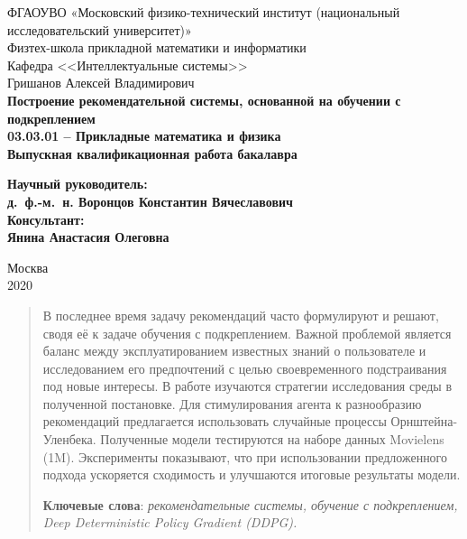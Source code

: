 \documentclass[14pt]{extarticle}
\begin{document}
\thispagestyle{empty}
\begin{center}
    \sc
        ФГАОУВО «Московский физико-технический институт \rm{(национальный исследовательский университет)}»\\
        Физтех-школа прикладной математики и информатики\\
        Кафедра <<Интеллектуальные системы>>\\[35mm]
    \rm\large
        Гришанов Алексей Владимирович\\[10mm]
    \bf\Large
		Построение рекомендательной системы, основанной на обучении с подкреплением\\[10mm]
    \rm\normalsize
        03.03.01 -- Прикладные математика и физика\\[10mm]
    \sc
        Выпускная квалификационная работа бакалавра\\[10mm]
\end{center}
\hfill\parbox{80mm}{
    \begin{flushleft}
    \bf
        Научный руководитель:\\
    \rm
        д.~ф.-м.~н. Воронцов Константин Вячеславович \\[1cm]
    \bf
        Консультант:\\
    \rm
        Янина Анастасия Олеговна \\[2cm]
    \end{flushleft}
}
\begin{center}
    Москва\\
    2020
\end{center}


\newpage
\tableofcontents
\newpage

\begin{abstract}

В последнее время задачу рекомендаций часто формулируют и решают, сводя её к задаче обучения с подкреплением. Важной проблемой является баланс между эксплуатированием известных знаний о пользователе и исследованием его предпочтений с целью своевременного подстраивания под новые интересы. В работе изучаются стратегии исследования среды в полученной постановке. Для стимулирования агента к разнообразию рекомендаций предлагается использовать случайные процессы Орнштейна-Уленбека. Полученные модели тестируются на наборе данных Movielens (1M). Эксперименты показывают, что при использовании предложенного подхода ускоряется сходимость и улучшаются итоговые результаты модели.

\bigskip
\textbf{Ключевые слова}: \emph{рекомендательные системы, обучение с подкреплением, Deep Deterministic Policy Gradient (DDPG).}
\end{abstract}
\end{document}
